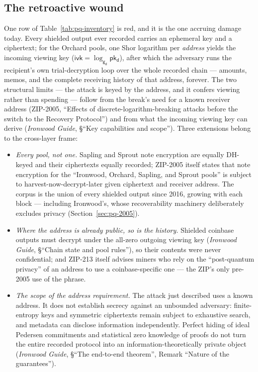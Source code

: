 \documentclass[11pt,a4paper]{article}
\theoremstyle{definition}
\newcommand{\ivk}{\ensuremath{\mathsf{ivk}}}
\newcommand{\pkd}{\ensuremath{\mathsf{pk_d}}}
\newcommand{\gd}{\ensuremath{\mathsf{g_d}}}
\begin{document}
\subsection{The retroactive wound}\label{sec:pq-retro}

One row of Table~\ref{tab:pq-inventory} is red, and it is the one
accruing damage today. Every shielded output ever recorded carries an
ephemeral key and a ciphertext; for the Orchard pools, one Shor
logarithm per \emph{address} yields the incoming viewing key
($\ivk = \log_{\gd} \pkd$), after which the adversary runs the
recipient's own trial-decryption loop over the whole recorded chain ---
amounts, memos, and the complete receiving history of that address,
forever. The two structural limits --- the attack is keyed by the
address, and it confers viewing rather than spending --- follow from the
break's need for a known receiver address (ZIP-2005, ``Effects of
discrete-logarithm-breaking attacks before the switch to the Recovery
Protocol'') and from what the incoming viewing key can derive
(\emph{Ironwood Guide}, \S``Key capabilities and scope''). Three
extensions belong to the cross-layer frame:

\begin{itemize}[leftmargin=*]
\item \emph{Every pool, not one.} Sapling and Sprout note encryption
are equally DH-keyed and their ciphertexts equally recorded; ZIP-2005
itself states that note encryption for the ``Ironwood, Orchard,
Sapling, and Sprout pools'' is subject to harvest-now-decrypt-later
given ciphertext and receiver address. The corpus is the union of every
shielded output since 2016, growing with each block --- including
Ironwood's, whose recoverability machinery deliberately excludes
privacy (Section~\ref{sec:pq-2005}).
\item \emph{Where the address is already public, so is the history.}
Shielded coinbase outputs must decrypt under the all-zero outgoing
viewing key (\emph{Ironwood Guide}, \S``Chain state and pool rules''),
so their contents were never confidential; and ZIP-213 itself advises
miners who rely on the ``post-quantum privacy'' of an address to use a
coinbase-specific one --- the ZIP's only pre-2005 use of the phrase.
\item \emph{The scope of the address requirement.} The attack just
described uses a known address. It does not establish secrecy against an
unbounded adversary: finite-entropy keys and symmetric ciphertexts remain
subject to exhaustive search, and metadata can disclose information
independently. Perfect hiding of ideal Pedersen commitments and statistical
zero knowledge of proofs do not turn the entire recorded protocol into an
information-theoretically private object (\emph{Ironwood Guide},
\S``The end-to-end theorem'', Remark ``Nature of the guarantees'').
\end{itemize}
\end{document}
